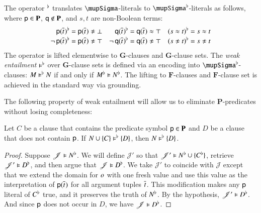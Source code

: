 \begin{rep}
\begin{defi}
The operator $^\flat$ translates $\mupSigma$-literals to
$\mupSigma\Wksup$-literals as follows, where $\mathsf{p} \in \mathbf{P}$,
$\mathsf{q} \notin \mathbf{P}$, and $s, t$ are non-Boolean terms:
%
\begin{align*}
  \Wk{\cst{p}(\tuple{t}{})} & = \cst{p}(\tuple{t}{}) \noteq \false
& \Wk{\cst{q}(\tuple{t}{})} & = \cst{q}(\tuple{t}{}) \eq \true
& \Wk{(s \eq t)} & = s \eq t \\[-\jot]
  \Wk{\lnot\,\cst{p}(\tuple{t}{})} & = \cst{p}(\tuple{t}{}) \noteq \true
& \Wk{\lnot\,\cst{q}(\tuple{t}{})} & = \cst{q}(\tuple{t}{}) \noteq \true
& \Wk{(s \noteq t)} & = s \noteq t
\end{align*}
%
The operator is lifted elementwise to $\mathbf{G}$-clauses and
$\mathbf{G}$-clause sets.
The \emph{weak entailment} $\vDash^\flat$ over $\mathbf{G}$-clause sets
is defined via an encoding into $\mupSigma\Wksup$-clauses:
$M \vDash^\flat N$ if and only if $M^\flat \vDash N^\flat$.
The lifting to $\mathbf{F}$-clauses and $\mathbf{F}$-clause set is achieved
in the standard way via grounding.
\end{defi}

The following property of weak entailment will allow us to eliminate
$\mathbf{P}$-predicates without losing completeness:

\begin{lemma}
\label{lem:p-Wk-entail}
Let $C$ be a clause that contains the predicate symbol $\mathsf{p} \in
\mathbf{P}$ and $D$ be a clause that does not contain $\mathsf{p}$. If $N
\cup \{C\} \vDash^\flat \{D\}$, then $N \vDash^\flat \{D\}$.
\end{lemma}

\begin{proof}
Suppose $\mathscr{J} \vDash N^\flat$. We will define $\mathscr{J}'$ so that
$\mathscr{J}' \vDash N^\flat \cup \{C^\flat\}$, retrieve $\mathscr{J}'
\vDash D^\flat$, and then argue that $\mathscr{J} \vDash D^\flat$. We
take $\mathscr{J}'$ to coincide with $\mathscr{J}$ except that we extend the
domain for $o$ with one fresh value and use this value as the
interpretation of $\mathsf{p}(\overline{t}_{})$ for all argument tuples $\overline{t}_{}$.
This modification makes any $\mathsf{p}$ literal of $C^\flat$ true, and it
preserves the truth of $N^\flat$. By the hypothesis, $\mathscr{J}' \vDash
D^\flat$. And since $\mathsf{p}$ does not occur in $D$, we have $\mathscr{J}
\vDash D^\flat$.
\end{proof}


\end{rep}
